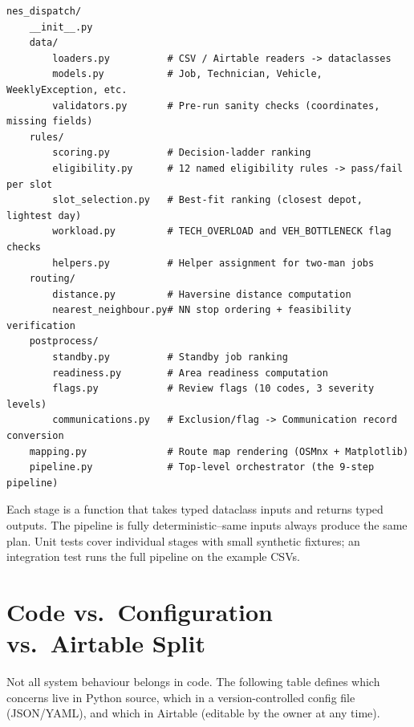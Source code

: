 \documentclass[12pt]{article}
\begin{document}
\begin{verbatim}
nes_dispatch/
    __init__.py
    data/
        loaders.py          # CSV / Airtable readers -> dataclasses
        models.py           # Job, Technician, Vehicle, WeeklyException, etc.
        validators.py       # Pre-run sanity checks (coordinates, missing fields)
    rules/
        scoring.py          # Decision-ladder ranking
        eligibility.py      # 12 named eligibility rules -> pass/fail per slot
        slot_selection.py   # Best-fit ranking (closest depot, lightest day)
        workload.py         # TECH_OVERLOAD and VEH_BOTTLENECK flag checks
        helpers.py          # Helper assignment for two-man jobs
    routing/
        distance.py         # Haversine distance computation
        nearest_neighbour.py# NN stop ordering + feasibility verification
    postprocess/
        standby.py          # Standby job ranking
        readiness.py        # Area readiness computation
        flags.py            # Review flags (10 codes, 3 severity levels)
        communications.py   # Exclusion/flag -> Communication record conversion
    mapping.py              # Route map rendering (OSMnx + Matplotlib)
    pipeline.py             # Top-level orchestrator (the 9-step pipeline)
\end{verbatim}

Each stage is a function that takes typed dataclass inputs and returns typed outputs.
The pipeline is fully deterministic--same inputs always produce the same plan.
Unit tests cover individual stages with small synthetic fixtures; an integration test runs the full pipeline on the example CSVs.

\section*{Code vs.\ Configuration vs.\ Airtable Split}
\label{sec:split}

Not all system behaviour belongs in code.
The following table defines which concerns live in Python source, which in a version-controlled config file (JSON/YAML), and which in Airtable (editable by the owner at any time).
\end{document}
